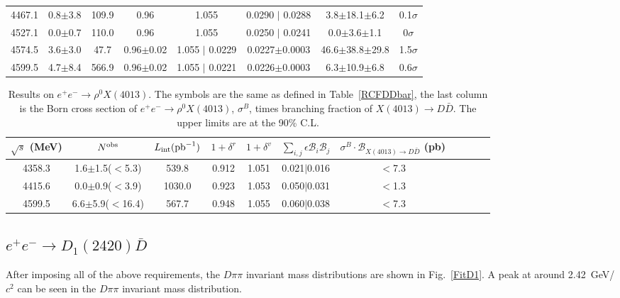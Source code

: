 \documentclass[aps,preprint,superscriptaddress,12pt,tightenlines]{revtex4}
\begin{document}
\begin{table}[htbp]
\begin{tabular}{c c c c c c c c}
     4467.1&      0.8$\pm$3.8     &109.9   &0.96 &1.055  &0.0290 $\mid$ 0.0288   &3.8$\pm$18.1$\pm$6.2  &0.1$\sigma$\\
     4527.1&      0.0$\pm$0.7     &110.0   &0.96 &1.055  &0.0250 $\mid$ 0.0241   &0.0$\pm$3.6$\pm$1.1    &0$\sigma$\\
     4574.5&      3.6$\pm$3.0     &47.7    &0.96$\pm$0.02 &1.055 $\mid$ 0.0229   &0.0227$\pm$0.0003   &46.6$\pm$38.8$\pm$29.8 &1.5$\sigma$\\
     4599.5&      4.7$\pm$8.4     &566.9   &0.96$\pm$0.02 &1.055 $\mid$ 0.0221   &0.0226$\pm$0.0003   &6.3$\pm$10.9$\pm$6.8   &0.6$\sigma$\\
    \hline \hline
\end{tabular}
\end{table}



\begin{table}[htbp]
\caption{Results on $e^{+}e^{-}\to \rho^{0}X(4013)$. The symbols
are the same as defined in Table~\ref{RCFDDbar}, the last column
is the Born cross section of $e^{+}e^{-}\to \rho^{0}X(4013)$,
$\sigma^{B}$, times branching fraction of $X(4013)\to D\bar{D}$.
The upper limits are at the 90\% C.L.} \label{RCFX4013}
\begin{tabular}{c c c c c c c c c c c}
\hline \hline    $\sqrt{s}$ (MeV)  &$N^{\rm obs}$  &$L_{\rm int}({\rm pb}^{-1})$
&$1+\delta^{r}$  &$1+\delta^{v}$  &$\sum_{i,j}\epsilon\mathcal{B}_{i}\mathcal{B}_{j}$
&$\sigma^{B}\cdot\mathcal{B}_{X(4013)\to D\bar{D}}$ (pb)  \\
    \hline
     4358.3     &1.6$\pm$1.5($<$5.3) &539.8          &0.912  &1.051  &0.021$\mid$0.016  &$<$7.3\\
     4415.6     &0.0$\pm$0.9($<$3.9) &1030.0         &0.923  &1.053  &0.050$\mid$0.031  &$<$1.3\\
     4599.5     &6.6$\pm$5.9($<$16.4)&567.7          &0.948  &1.055  &0.060$\mid$0.038  &$<$7.3\\
    \hline \hline
\end{tabular}
\end{table}

\subsection{$e^{+}e^{-} \rightarrow D_{1}(2420)\bar{D}$}

After imposing all of the above requirements, the $D\pi\pi$ invariant mass distributions are shown in
Fig.~\ref{FitD1}. A peak at around 2.42~GeV/$c^{2}$ can
be seen in the $D\pi\pi$ invariant mass distribution.
\end{document}
